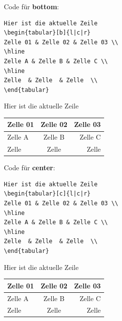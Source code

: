 \begin{frame}[fragile]

\begin{multicols}{2}
	
Code für \textbf{bottom}:
	
\columnbreak

{\tiny
\begin{lstlisting}
Hier ist die aktuelle Zeile
\begin{tabular}[b]{l|c|r}
Zelle 01 & Zelle 02 & Zelle 03 \\
\hline
Zelle A & Zelle B & Zelle C \\
\hline
Zelle  & Zelle  & Zelle  \\
\end{tabular}
\end{lstlisting}
}

\end{multicols}

Hier ist die aktuelle Zeile	
\begin{tabular}[b]{l|c|r}
	Zelle 01 & Zelle 02 & Zelle 03 \\
	\hline
	Zelle A & Zelle B & Zelle C \\
	\hline
	Zelle  & Zelle  & Zelle  \\
\end{tabular}


\pause 


\begin{multicols}{2}
	
Code für \textbf{center}:
	
\columnbreak

{\tiny
\begin{lstlisting}
Hier ist die aktuelle Zeile
\begin{tabular}[c]{l|c|r}
Zelle 01 & Zelle 02 & Zelle 03 \\
\hline
Zelle A & Zelle B & Zelle C \\
\hline
Zelle  & Zelle  & Zelle  \\
\end{tabular}
\end{lstlisting}
}

\end{multicols}


Hier ist die aktuelle Zeile	
\begin{tabular}[c]{l|c|r}
	Zelle 01 & Zelle 02 & Zelle 03 \\
	\hline
	Zelle A & Zelle B & Zelle C \\
	\hline
	Zelle  & Zelle  & Zelle  \\
\end{tabular}

\end{frame}


